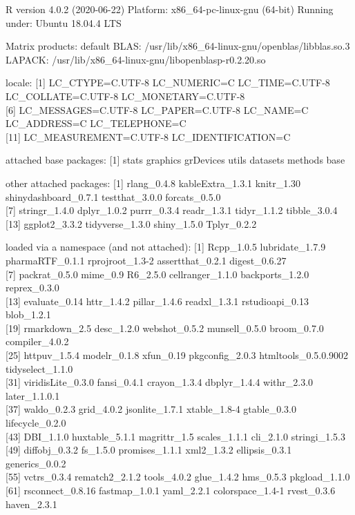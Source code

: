 \documentclass[
]{article}
\begin{document}
R version 4.0.2 (2020-06-22) Platform: x86\_64-pc-linux-gnu (64-bit)
Running under: Ubuntu 18.04.4 LTS

Matrix products: default BLAS:
/usr/lib/x86\_64-linux-gnu/openblas/libblas.so.3 LAPACK:
/usr/lib/x86\_64-linux-gnu/libopenblasp-r0.2.20.so

locale: {[}1{]} LC\_CTYPE=C.UTF-8 LC\_NUMERIC=C LC\_TIME=C.UTF-8
LC\_COLLATE=C.UTF-8 LC\_MONETARY=C.UTF-8\\
{[}6{]} LC\_MESSAGES=C.UTF-8 LC\_PAPER=C.UTF-8 LC\_NAME=C LC\_ADDRESS=C
LC\_TELEPHONE=C\\
{[}11{]} LC\_MEASUREMENT=C.UTF-8 LC\_IDENTIFICATION=C

attached base packages: {[}1{]} stats graphics grDevices utils datasets
methods base

other attached packages: {[}1{]} rlang\_0.4.8 kableExtra\_1.3.1
knitr\_1.30 shinydashboard\_0.7.1 testthat\_3.0.0 forcats\_0.5.0\\
{[}7{]} stringr\_1.4.0 dplyr\_1.0.2 purrr\_0.3.4 readr\_1.3.1
tidyr\_1.1.2 tibble\_3.0.4\\
{[}13{]} ggplot2\_3.3.2 tidyverse\_1.3.0 shiny\_1.5.0 Tplyr\_0.2.2

loaded via a namespace (and not attached): {[}1{]} Rcpp\_1.0.5
lubridate\_1.7.9 pharmaRTF\_0.1.1 rprojroot\_1.3-2 assertthat\_0.2.1
digest\_0.6.27\\
{[}7{]} packrat\_0.5.0 mime\_0.9 R6\_2.5.0 cellranger\_1.1.0
backports\_1.2.0 reprex\_0.3.0\\
{[}13{]} evaluate\_0.14 httr\_1.4.2 pillar\_1.4.6 readxl\_1.3.1
rstudioapi\_0.13 blob\_1.2.1\\
{[}19{]} rmarkdown\_2.5 desc\_1.2.0 webshot\_0.5.2 munsell\_0.5.0
broom\_0.7.0 compiler\_4.0.2\\
{[}25{]} httpuv\_1.5.4 modelr\_0.1.8 xfun\_0.19 pkgconfig\_2.0.3
htmltools\_0.5.0.9002 tidyselect\_1.1.0\\
{[}31{]} viridisLite\_0.3.0 fansi\_0.4.1 crayon\_1.3.4 dbplyr\_1.4.4
withr\_2.3.0 later\_1.1.0.1\\
{[}37{]} waldo\_0.2.3 grid\_4.0.2 jsonlite\_1.7.1 xtable\_1.8-4
gtable\_0.3.0 lifecycle\_0.2.0\\
{[}43{]} DBI\_1.1.0 huxtable\_5.1.1 magrittr\_1.5 scales\_1.1.1
cli\_2.1.0 stringi\_1.5.3\\
{[}49{]} diffobj\_0.3.2 fs\_1.5.0 promises\_1.1.1 xml2\_1.3.2
ellipsis\_0.3.1 generics\_0.0.2\\
{[}55{]} vctrs\_0.3.4 rematch2\_2.1.2 tools\_4.0.2 glue\_1.4.2
hms\_0.5.3 pkgload\_1.1.0\\
{[}61{]} rsconnect\_0.8.16 fastmap\_1.0.1 yaml\_2.2.1 colorspace\_1.4-1
rvest\_0.3.6 haven\_2.3.1
\end{document}

